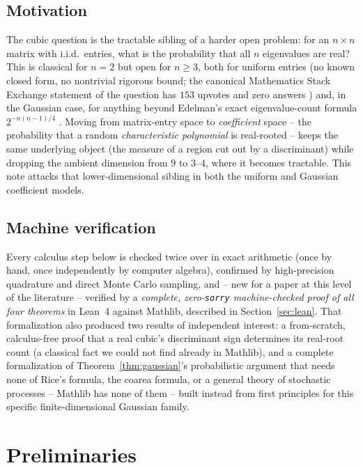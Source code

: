 \documentclass[11pt,reqno]{amsart}
\theoremstyle{plain}
\theoremstyle{remark}
\begin{document}
\subsection*{Motivation}
The cubic question is the tractable sibling of a harder open problem: for an
$n\times n$ matrix with i.i.d.\ entries, what is the probability that all $n$
eigenvalues are real? This is classical for $n=2$ but open for $n\ge3$, both
for uniform entries (no known closed form, no nontrivial rigorous bound; the
canonical Mathematics Stack Exchange statement of the question has $153$
upvotes and zero answers \cite{mse-eigenvalue-question}) and, in the
Gaussian case, for anything beyond Edelman's exact eigenvalue-count formula
$2^{-n(n-1)/4}$ \cite{edelman1997}. Moving from matrix-entry space to
\emph{coefficient} space -- the probability that a random \emph{characteristic
polynomial} is real-rooted -- keeps the same underlying object (the measure
of a region cut out by a discriminant) while dropping the ambient dimension
from $9$ to $3$--$4$, where it becomes tractable. This note attacks that
lower-dimensional sibling in both the uniform and Gaussian coefficient
models.

\subsection*{Machine verification}
Every calculus step below is checked twice over in exact arithmetic (once by
hand, once independently by computer algebra), confirmed by high-precision
quadrature and direct Monte Carlo sampling, and -- new for a paper at this
level of the literature -- verified by a \emph{complete, zero-\texttt{sorry}
machine-checked proof of all four theorems} in Lean~4 against Mathlib,
described in Section~\ref{sec:lean}. That formalization also produced two
results of independent interest: a from-scratch, calculus-free proof that a
real cubic's discriminant sign determines its real-root count (a classical
fact we could not find already in Mathlib), and a complete formalization of
Theorem~\ref{thm:gaussian}'s probabilistic argument that needs none of
Rice's formula, the coarea formula, or a general theory of stochastic
processes -- Mathlib has none of them -- built instead from first principles
for this specific finite-dimensional Gaussian family.

\section{Preliminaries} \label{sec:prelim}
\end{document}
